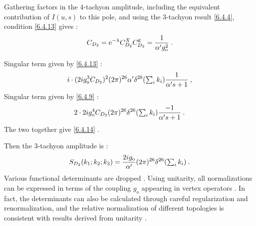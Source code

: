 Gathering factors in the 4-tachyon amplitude, including the equivalent contribution of $I(u, s)$ to this pole, and using the 3-tachyon result \eqref{6.4.4}, condition \eqref{6.4.13} gives :
\begin{equation}
	C_{D_{2}}=\mathrm{e}^{-\lambda} C_{D_{2}}^{X} C_{D_{2}}^{\mathrm{g}}=\frac{1}{\alpha^{\prime} g_{\mathrm{o}}^{2}} \:. \label{6.4.14}
\end{equation}
\begin{tcolorbox}
	\begin{remark}
		Singular term given by \eqref{6.4.13} :
		\[
		i \cdot(2 i g_{\mathrm{o}}^{3} C_{D_{2}})^{2}(2 \pi)^{26} \alpha^{\prime} 
		\delta^{2 b}({\textstyle\sum_{i} k_{i}}) \frac{1}{\alpha^{\prime} s+1} \:,
		\]
		Singular term given by \eqref{6.4.9} :
		\[
		2 \cdot 2 i g_{\mathrm{o}}^{4} C_{D_{2}}(2 \pi)^{26} \delta^{26}({\textstyle\sum_{i} k_{i}}) \frac{-1}{\alpha^{\prime} s+1}\:.
		\]
		The two together give \eqref{6.4.14} .
	\end{remark}
\end{tcolorbox}
\noindent Then the 3-tachyon amplitude is :
\begin{equation}
	S_{D_{2}}(k_{1} ; k_{2} ; k_{3})=\frac{2 i g_{\mathrm{o}}}{\alpha^{\prime}}(2 \pi)^{26} \delta^{26}({\textstyle\sum_{i} k_{i}}) \:. 
	\label{6.4.15}
\end{equation}
Various functional determinants are dropped . Using unitarity, all normalizations can be expressed in terms of the coupling $g_o$ appearing in vertex operators . In fact, the determinants can also be calculated through careful regularization and renormalization, and the relative normalization of different topologies is consistent with results derived from unitarity .

